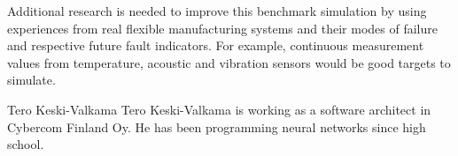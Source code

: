 \documentclass[journal]{IEEEtran}
\begin{document}
Additional research is needed to improve this benchmark simulation by using experiences from real flexible manufacturing systems and their modes of failure
and respective future fault indicators. For example, continuous measurement values from temperature, acoustic and vibration sensors would be good targets
to simulate.

\appendices




\begin{IEEEbiography}{Tero Keski-Valkama}
Tero Keski-Valkama is working as a software architect in Cybercom Finland Oy. He has been programming neural networks since high school.
\end{IEEEbiography}
\end{document}
